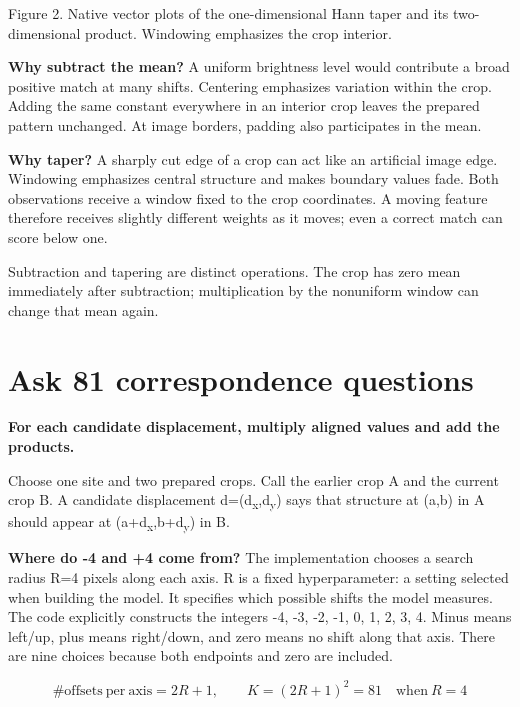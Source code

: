 \documentclass[11pt,letterpaper]{article}
\begin{document}
{
\small\color{muted} Figure 2. Native vector plots of the one-dimensional Hann taper and its two-dimensional product. Windowing emphasizes the crop interior.\par}


\textbf{Why subtract the mean?} A uniform brightness level would contribute a broad positive match at many shifts. Centering emphasizes variation within the crop. Adding the same constant everywhere in an interior crop leaves the prepared pattern unchanged. At image borders, padding also participates in the mean.


\textbf{Why taper?} A sharply cut edge of a crop can act like an artificial image edge. Windowing emphasizes central structure and makes boundary values fade. Both observations receive a window fixed to the crop coordinates. A moving feature therefore receives slightly different weights as it moves; even a correct match can score below one.


{
\small\color{muted} Subtraction and tapering are distinct operations. The crop has zero mean immediately after subtraction; multiplication by the nonuniform window can change that mean again.\par}


\clearpage

\section{Ask 81 correspondence questions}\label{sec4}

\textbf{For each candidate displacement, multiply aligned values and add the products.}


Choose one site and two prepared crops. Call the earlier crop A and the current crop B. A candidate displacement d=(d\textsubscript{x},d\textsubscript{y}) says that structure at (a,b) in A should appear at (a+d\textsubscript{x},b+d\textsubscript{y}) in B.


\textbf{Where do -4 and +4 come from?} The implementation chooses a search radius R=4 pixels along each axis. R is a fixed hyperparameter: a setting selected when building the model. It specifies which possible shifts the model measures. The code explicitly constructs the integers -4, -3, -2, -1, 0, 1, 2, 3, 4. Minus means left/\allowbreak{}up, plus means right/\allowbreak{}down, and zero means no shift along that axis. There are nine choices because both endpoints and zero are included.


\begin{equation}\#\mathrm{offsets\ per\ axis}=2R+1,\qquad K=(2R+1)^2=81\quad\mathrm{when}\ R=4\end{equation}
\end{document}
